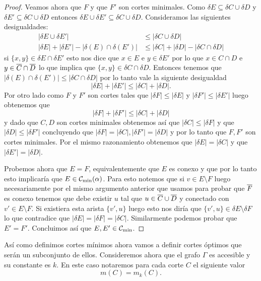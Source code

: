\documentclass[tesis.tex]{subfiles}
\begin{document}
\begin{proof}
	Veamos ahora que $F$ y que $F'$ son cortes minimales.
	Como $\delta E \subseteq \delta C \cup \delta D$ y $\delta E' \subseteq \delta C \cup \delta D$ entonces $\delta E \cup \delta E' \subseteq \delta C \cup \delta D$.
	Consideramos las siguientes desigualdades:
	\begin{align*}
		|\delta E \cup \delta E'| & \le |\delta C \cup \delta D| \\
		|\delta E| + |\delta E'| - |\delta (E) \cap \delta (E')| & \le |\delta C| + |\delta D| - |\delta C \cap \delta D|
	\end{align*}
	si $\{x,y\} \in \delta E \cap \delta E'$ esto nos dice que $x \in E$ e $y \in \delta E'$ por lo que $x \in C \cap D$ e $y \in \overline C \cap \overline D$ lo que implica que $\{x,y\} \in \delta C \cap \delta D$.
	Entonces tenemos que $|\delta (E) \cap \delta (E')| \le |\delta C \cap \delta D|$ por lo tanto vale la siguiente desigualdad
	\[
	|\delta E| + |\delta E'| \le |\delta C| + |\delta D|.
	\]	
	Por otro lado como $F$ y $F'$ son cortes tales que $|\delta F| \le |\delta E|$ y $|\delta F'| \le |\delta E'|$ luego obtenemos que
	\[
	|\delta F| + |\delta F'| \le |\delta C| + |\delta D|
	\] 
	y dado que $C,D$ son cortes minimales obtenemos así que $|\delta C| \le |\delta F|$ y que $|\delta D| \le |\delta F'|$ concluyendo que $|\delta F | = |\delta C|, |\delta F'| = |\delta D|$ y por lo tanto que $F,F'$ son cortes minimales.
	Por el mismo razonamiento obtenemos que $|\delta E| = |\delta C|$ y que $|\delta E'| = |\delta D|$.
	
	Probemos ahora que $E=F$, equivalentemente que $E$ es conexo y que por lo tanto esto implicaría que $E \in {\cal C}_{\text{min}}(\alpha)$.
	Para esto notemos que si $v \in E \setminus F$ luego necesariamente por el mismo argumento anterior que usamos para probar que $\overline F$ es conexo tenemos que debe existir $u$ tal que $u \in \overline C \cup \overline D$ y conectado con $v' \in E \setminus F$.
	Si existiera esta arista $\{v',u \}$ luego esto nos diría que $\{v',u \} \in \delta E \setminus \delta F$ lo que contradice que $|\delta E| = |\delta F| = |\delta C|$.
	Similarmente podemos probar que $E' = F'$.
	Concluimos así que $E, E' \in {\cal C}_{\text{min}}$.
\end{proof}



Así como definimos cortes mínimos ahora vamos a definir cortes óptimos que serán un subconjunto de ellos.
Consideremos ahora que el grafo $\Gamma$ es accesible y su constante es $k$.
En este caso notaremos para cada corte $C$ el siguiente valor
\[
m(C) = m_k(C).
\]
\end{document}
